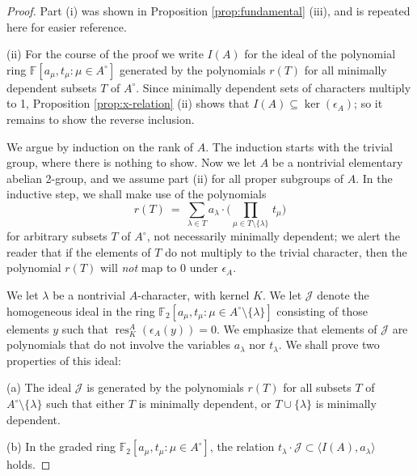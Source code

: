 \documentclass{amsart}[12pt]
\DeclareMathOperator{\res}{res}
\newcommand{\mF}{{\mathbb F}}
\newcommand{\Jc}{{\mathcal J}}
\newcommand{\td}[1]{\langle #1\rangle}
\numberwithin{equation}{section}
\theoremstyle{definition}
\begin{document}
\begin{proof}
  Part (i) was shown in Proposition \ref{prop:fundamental} (iii),
  and is repeated here for easier reference.

  (ii)
  For the course of the proof we write $I(A)$ for the ideal of the polynomial ring 
  $\mF[a_\mu,t_\mu\colon \mu\in A^\circ]$ generated by the polynomials $r(T)$
  for all minimally dependent subsets $T$ of $A^\circ$. 
  Since minimally dependent sets of characters multiply to 1,
  Proposition \ref{prop:x-relation} (ii) shows that $I(A)\subseteq \ker(\epsilon_A)$;
  so it remains to show the reverse inclusion.

  We argue by induction on the rank of $A$.
  The induction starts with the trivial group, where there is nothing to show.
  Now we let $A$ be a nontrivial elementary abelian 2-group, and we assume part (ii)
  for all proper subgroups of $A$.
  In the inductive step, we shall make use of the polynomials
  \[  r(T)\ = \
    \sum_{\lambda\in T}  a_\lambda \cdot\bigg( \prod_{\mu\in T\setminus\{\lambda\}}\, t_\mu\bigg) \]
  for arbitrary subsets $T$ of $A^\circ$, not necessarily minimally dependent;
  we alert the reader that if the elements of $T$ do not multiply to the trivial character,
  then the polynomial $r(T)$ will {\em not} map to 0 under $\epsilon_A$.
  
  We let $\lambda$ be a nontrivial $A$-character, with kernel $K$.
  We let $\Jc$ denote the homogeneous ideal in the ring
  $\mF_2[a_\mu,t_\mu\colon  \mu\in A^\circ\setminus\{\lambda\}]$ consisting of those
  elements $y$ such that $\res^A_K(\epsilon_A(y))=0$.
  We emphasize that elements of $\Jc$ are polynomials that do not involve the variables
  $a_\lambda$ nor $t_\lambda$.
  We shall prove two properties of this ideal:\smallskip

  (a) The ideal $\Jc$ is generated by the polynomials $r(T)$ for all
  subsets $T$ of $A^\circ\setminus\{\lambda\}$
  such that either $T$ is minimally dependent, or $T\cup\{\lambda\}$
  is minimally dependent.\smallskip

  (b) In the graded ring   $\mF_2[a_\mu,t_\mu\colon  \mu\in A^\circ]$,
  the relation $t_\lambda\cdot \Jc\subset \td{I(A),a_\lambda}$ holds.\smallskip


\end{proof}
\end{document}
